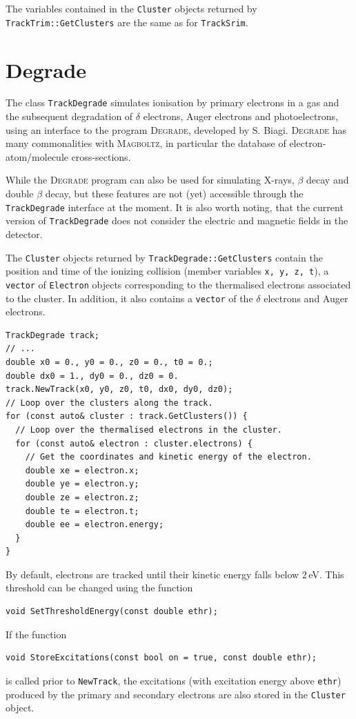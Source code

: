 The variables contained in the \texttt{Cluster} objects returned by \texttt{TrackTrim::GetClusters} are the same as for \texttt{TrackSrim}.
 
\section{Degrade}
The class \texttt{TrackDegrade} simulates ionisation by primary electrons 
in a gas and the subsequent degradation of $\delta$ electrons, 
Auger electrons and photoelectrons, 
using an interface to the program \textsc{Degrade}, developed by S. Biagi. 
\textsc{Degrade} has many commonalities with \textsc{Magboltz}, 
in particular the database of electron-atom/molecule cross-sections. 

While the \textsc{Degrade} program can also be used for simulating X-rays, 
$\beta$ decay and double $\beta$ decay, but these features are not (yet) 
accessible through the \texttt{TrackDegrade} interface at the moment. 
It is also worth noting, that the current version of \texttt{TrackDegrade} 
does not consider the electric and magnetic fields in the detector.

The \texttt{Cluster} objects returned by \texttt{TrackDegrade::GetClusters} 
contain the position and time of the ionizing collision 
(member variables \texttt{x, y, z, t}), a \texttt{vector} of 
\texttt{Electron} objects corresponding to the thermalised electrons 
associated to the cluster. In addition, it also contains a \texttt{vector} 
of the $\delta$ electrons and Auger electrons.

\begin{lstlisting}
TrackDegrade track;
// ...
double x0 = 0., y0 = 0., z0 = 0., t0 = 0.;
double dx0 = 1., dy0 = 0., dz0 = 0.
track.NewTrack(x0, y0, z0, t0, dx0, dy0, dz0);
// Loop over the clusters along the track.
for (const auto& cluster : track.GetClusters()) {
  // Loop over the thermalised electrons in the cluster.
  for (const auto& electron : cluster.electrons) {
    // Get the coordinates and kinetic energy of the electron.
    double xe = electron.x;
    double ye = electron.y;
    double ze = electron.z;
    double te = electron.t;
    double ee = electron.energy;
  }
}
\end{lstlisting}

By default, electrons are tracked until their kinetic energy falls below 
2\,eV. This threshold can be changed using the function
\begin{lstlisting}
void SetThresholdEnergy(const double ethr);
\end{lstlisting}

If the function 
\begin{lstlisting}
void StoreExcitations(const bool on = true, const double ethr);
\end{lstlisting}
is called prior to \texttt{NewTrack}, the excitations (with excitation 
energy above \texttt{ethr}) produced by the primary and secondary electrons 
are also stored in the \texttt{Cluster} object. 
